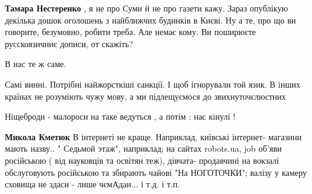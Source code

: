 \begin{itemize}
\begin{itemize}
\begin{itemize}
 
\textbf{Тамара Нестеренко} , я не про Суми й не про газети кажу. Зараз
опублікую декілька дошок оголошень з найближчих будинків в Києві.  Ну а те, про
що ви говорите, безумовно, робити треба. Але немає кому. Ви поширюєте
русскоязичниє дописи, от скажіть?
\end{itemize}

\end{itemize}

 
В нас те ж саме.

 

Самі винні. Потрібні найжорсткіші санкції. І щоб ігнорували той язик. В інших
країнах не розуміють чужу мову, а ми підлещуємося до звихнуточєлюстних


 
Ніщеброди - малороси на таке ведуться , а потім : нас кінулі !

\begin{itemize}
 
\textbf{Микола Кметюк} В інтернеті не краще. Наприклад, київські інтернет-
магазини мають назву.. " Седьмой этаж", наприклад; на сайтах robots.ua, job
об'яви російською ( від науковців та освітян теж), дівчата- продавчині на
вокзалі обслуговують російською та збирають чайові "На НОГОТОЧКИ"; валізу у
камеру сховища не здаси - лише чємАдан... і т.д. і т.п.
\end{itemize}


\end{itemize}

